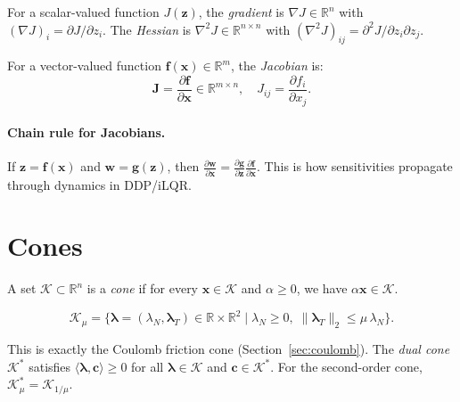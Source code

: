 \documentclass[11pt,twoside]{report}
\theoremstyle{definition}
\theoremstyle{plain}
\theoremstyle{remark}
\newcommand{\R}{\mathbb{R}}
\newcommand{\x}{\bm{x}}
\newcommand{\f}{\bm{f}}
\newcommand{\0}{\bm{0}}
\newcommand{\J}{\bm{J}}
\newcommand{\Kc}{\mathcal{K}}
\begin{document}
For a scalar-valued function $J(\bm{z})$, the \emph{gradient} is
$\nabla J\in\R^{n}$ with $(\nabla J)_{i}=\partial J/\partial z_{i}$.
The \emph{Hessian} is $\nabla^{2}J\in\R^{n\times n}$ with
$(\nabla^{2}J)_{ij}=\partial^{2}J/\partial z_{i}\partial z_{j}$.

For a vector-valued function $\f(\x)\in\R^{m}$, the \emph{Jacobian} is:
\begin{equation}
\J=\frac{\partial\f}{\partial\x}\in\R^{m\times n},\quad
J_{ij}=\frac{\partial f_{i}}{\partial x_{j}}.
\end{equation}

\paragraph{Chain rule for Jacobians.}
If $\bm{z}=\f(\x)$ and $\bm{w}=\bm{g}(\bm{z})$, then
$\frac{\partial\bm{w}}{\partial\x}=\frac{\partial\bm{g}}{\partial\bm{z}}\frac{\partial\f}{\partial\x}$.
This is how sensitivities propagate through dynamics in DDP/iLQR.

\section{Cones}
\label{sec:cones}

\begin{definitionbox}[Cone]
A set $\Kc\subset\R^{n}$ is a \emph{cone} if for every $\x\in\Kc$ and
$\alpha\ge 0$, we have $\alpha\x\in\Kc$.
\end{definitionbox}

\begin{definitionbox}
\begin{equation}\label{eq:soc}
\Kc_{\mu}=\bigl\{\bm{\lambda}=(\lambda_{N},\bm{\lambda}_{T})
\in\R\times\R^{2}\;\big|\;\lambda_{N}\ge 0,\;
\|\bm{\lambda}_{T}\|_{2}\le\mu\,\lambda_{N}\bigr\}.
\end{equation}
\end{definitionbox}

This is exactly the Coulomb friction cone (Section~\ref{sec:coulomb}).
The \emph{dual cone} $\Kc^{*}$ satisfies $\langle\bm{\lambda},\bm{c}\rangle\ge 0$
for all $\bm{\lambda}\in\Kc$ and $\bm{c}\in\Kc^{*}$.
For the second-order cone, $\Kc_{\mu}^{*}=\Kc_{1/\mu}$.
\end{document}
